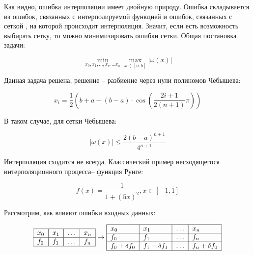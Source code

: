 \documentclass[10pt,a4paper]{article}
\begin{document}
	Как видно, ошибка интерполяции имеет двойную природу. Ошибка складывается 
	из ошибок, связанных с интерполируемой функцией и ошибок, связанных с сеткой
	, на которой происходит интерполяция. Значит, если есть возможность выбирать 
	сетку, то можно минимизировать ошибки сетки. Общая постановка задачи:
	
	\begin{equation}
		\min\limits_{x_{0}, x_{1}, \ldots, x_{i}, \ldots x_{n}}\max_{x \in 
		\left[a, b\right]}\left|\omega\left(x\right)\right|
	\end{equation}
	
	Данная задача решена, решение -- разбиение через нули полиномов Чебышева:
	
	\begin{equation}
		x_{i} = \frac{1}{2}\left(b + a - \left(b - a\right)\cdot\cos
		\left(\frac{2i + 1}{2\left(n + 1\right)}\pi\right)\right)
	\end{equation}
	
	В таком случае, для сетки Чебышева:
	
	\begin{equation}
		\left|\omega\left(x\right)\right| \leqslant \frac{2\left(b - a
		\right)^{n + 1}}{4^{n + 1}}
	\end{equation}
	
	Интерполяция сходится не всегда. Классический пример несходящегося 
	интерполяционного процесса-- функция Рунге: 
	
	\begin{equation}
		f\left(x\right) = \frac{1}{1 + \left(5x\right)^{2}}, x \in 
	\left[-1, 1\right]
	\end{equation}
	
	Рассмотрим, как влияют ошибки входных данных:
	
	\begin{equation}
		\centering
	\begin{tabular}{|l|l|l|l|}
	\hline
		$x_{0}$ & $x_{1}$ & $\ldots$ & $x_{n}$ \\ \hline
		$f_{0}$ & $f_{1}$ & $\ldots$ & $f_{n}$ \\ \hline
	\end{tabular} 
	\rightarrow 
	\centering
	\begin{tabular}{|l|l|l|l|}
	\hline
		$x_{0}$ & $x_{1}$ & $\ldots$ & $x_{n}$ \\ \hline
		$f_{0}$ & $f_{1}$ & $\ldots$ & $f_{n}$ \\ \hline
		$f_{0} + \delta f_{0}$ & $f_{1}+ \delta f_{1}$ & 
		$\ldots$ & $f_{n} + \delta f_{0}$ \\ \hline
	\end{tabular} 
	\end{equation}
	
\end{document}
